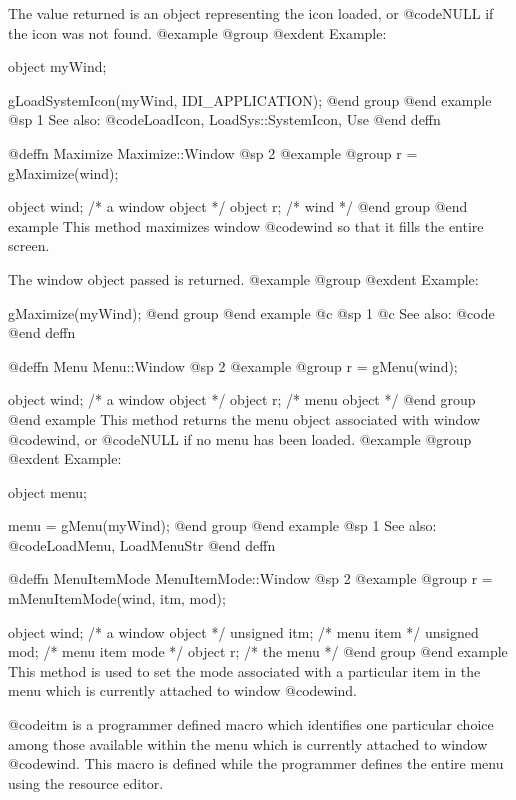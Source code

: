 The value returned is an object representing the icon loaded, or
@code{NULL} if the icon was not found.
@example
@group
@exdent Example:

object  myWind;

gLoadSystemIcon(myWind, IDI_APPLICATION);
@end group
@end example
@sp 1
See also:  @code{LoadIcon, LoadSys::SystemIcon, Use}
@end deffn














@deffn {Maximize} Maximize::Window
@sp 2
@example
@group
r = gMaximize(wind);

object  wind;   /*  a window object  */
object  r;      /*  wind             */
@end group
@end example
This method maximizes window @code{wind} so that it fills the
entire screen.

The window object passed is returned.
@example
@group
@exdent Example:

gMaximize(myWind);
@end group
@end example
@c @sp 1
@c See also:  @code{}
@end deffn




@deffn {Menu} Menu::Window
@sp 2
@example
@group
r = gMenu(wind);

object  wind;   /*  a window object  */
object  r;      /*  menu object      */
@end group
@end example
This method returns the menu object associated with window
@code{wind}, or @code{NULL} if no menu has been loaded.
@example
@group
@exdent Example:

object  menu;

menu = gMenu(myWind);
@end group
@end example
@sp 1
See also:  @code{LoadMenu, LoadMenuStr}
@end deffn




@deffn {MenuItemMode} MenuItemMode::Window
@sp 2
@example
@group
r = mMenuItemMode(wind, itm, mod);

object  wind;   /*  a window object     */
unsigned itm;   /*  menu item           */
unsigned mod;   /*  menu item mode      */
object   r;        /*  the menu         */
@end group
@end example
This method is used to set the mode associated with a particular item
in the menu which is currently attached to window @code{wind}.

@code{itm} is a programmer defined macro which identifies one particular
choice among those available within the menu which is currently attached
to window @code{wind}.  This macro is defined while the programmer defines
the entire menu using the resource editor.

